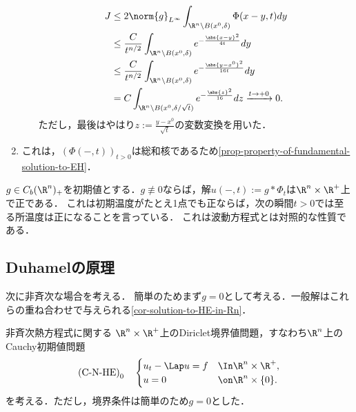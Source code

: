 \documentclass[uplatex,dvipdfmx]{jsreport}
\begin{document}
\begin{Proof}
\begin{enumerate}
\begin{enumerate}[(i)]
\begin{align*}
                J&\le2\norm{g}_{L^\infty}\int_{\R^n\setminus B(x^0,\delta)}\Phi(x-y,t)dy\\
                &\le\frac{C}{t^{n/2}}\int_{\R^n\setminus B(x^0,\delta)}e^{-\frac{\abs{x-y}^2}{4t}}dy\\
                &\le\frac{C}{t^{n/2}}\int_{\R^n\setminus B(x^0,\delta)}e^{-\frac{\abs{y-x^0}^2}{16t}}dy\\
                &=C\int_{\R^n\setminus B(x^0,\delta/\sqrt{t})}e^{-\frac{\abs{z}^2}{16}}dz\xrightarrow{t\to+0}0.
            \end{align*}
            ただし，最後はやはり$z:=\frac{y-x^0}{\sqrt{t}}$の変数変換を用いた．
        \end{enumerate}
        \item これは，$(\Phi(-,t))_{t>0}$は総和核であるため\ref{prop-property-of-fundamental-solution-to-EH}．
    \end{enumerate}
\end{Proof}

\begin{observation}[熱方程式は無限伝播速度を許す]
    $g\in C_b(\R^n)_+$を初期値とする．$g\not\equiv 0$ならば，解$u(-,t):=g*\Phi_t$は$\R^n\times\R^+$上で正である．
    これは初期温度がたとえ1点でも正ならば，次の瞬間$t>0$では至る所温度は正になることを言っている．
    これは波動方程式とは対照的な性質である．
\end{observation}

\subsection{Duhamelの原理}

\begin{tcolorbox}[colframe=ForestGreen, colback=ForestGreen!10!white,breakable,colbacktitle=ForestGreen!40!white,coltitle=black,fonttitle=\bfseries\sffamily,
title=]
    次に非斉次な場合を考える．
    簡単のためまず$g=0$として考える．一般解はこれらの重ね合わせで与えられる\ref{cor-solution-to-HE-in-Rn}．
\end{tcolorbox}

\begin{problem*}
    非斉次熱方程式に関する
    $\R^n\times\R^+$上のDiriclet境界値問題，すなわち$\R^n$上のCauchy初期値問題
    \[\text{(C-N-HE)}_0\quad\begin{cases}
        u_t-\Lap u=f&\In\R^n\times\R^+,\\
        u=0&\on\R^n\times\{0\}.
    \end{cases}\]
    を考える．ただし，境界条件は簡単のため$g=0$とした．
\end{problem*}
\end{document}
